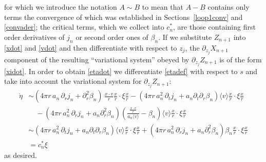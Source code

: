\documentclass[11pt]{article}
\def\p0{\langle v \rangle}
\begin{document}
for which we introduce the notation $A\sim B$ to mean that $A - B$
contains only terms the convergence of which
was established in Sections~\ref{loop1conv} and \ref{convader};
the critical terms, which we collect into $c_{n}^\ast$,
are those containing first order derivatives of $j_n$ or second order
ones of $\beta_n$. If we substitute $Z_{n+1}$ into \eqref{xdot} and \eqref{vdot}
and then differentiate with respect to $z_j$, the $\partial_{z_j} X_{n+1}$
component of the resulting ``variational system'' obeyed by
$\partial_{z_j} Z_{n+1}$ is of the form \eqref{xidot}.
In order to obtain \eqref{etadot} 
we differentiate \eqref{etadef} with respect to $s$ and take into account
the variational system for $\partial_{z_j} Z_{n+1}$:
\begin{align*}
  \dot \eta
  &\sim
  \left(4\pi r \,a_n\, \partial_r j_n + \partial_r^2 \beta_n\right)
  \, \frac{x\cdot v}{r} \frac{x}{r}\cdot\xi\frac{x}{r}
  -\left(4\pi r \,a_n^2\, \partial_t j_n + a_n \partial_t\partial_r\beta_n\right)
  \p0 \frac{x}{r} \cdot \xi \frac{x}{r}\\
  &\quad{}
  - \left(4\pi r \,a_n^2\, \partial_r j_n + a_n \partial_r^2\beta_n\right)
  \left(\frac{\frac{x\cdot v}{r}}{a_n \p0}-\beta_n\right)
  \p0 \frac{x}{r} \cdot \xi \frac{x}{r}\\
  &\sim
  \left(4\pi r \,a_n^2\, \partial_t j_n + a_n \partial_t\partial_r\beta_n\right)
  \p0 \frac{x}{r} \cdot \xi \frac{x}{r}
  + \left(4\pi r \,a_n^2\, \partial_r j_n + a_n \partial_r^2\beta_n\right) \beta_n
  \frac{x}{r}\cdot\xi\frac{x}{r}\\
  &= c_{n}^\ast \xi
\end{align*}
as desired.
\end{document}
